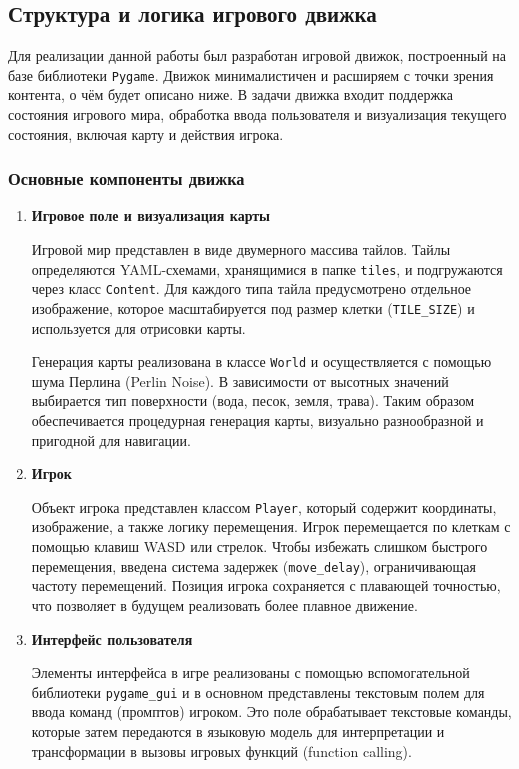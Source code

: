 \documentclass[14pt]{extarticle}
\begin{document}
\subsection{Структура и логика игрового движка}
Для реализации данной работы был разработан игровой движок, построенный на базе библиотеки \texttt{Pygame}. Движок минималистичен и расширяем с точки зрения контента, о чём будет описано ниже. В задачи движка входит поддержка состояния игрового мира, обработка ввода пользователя и визуализация текущего состояния, включая карту и действия игрока.

\subsubsection*{Основные компоненты движка}

\begin{enumerate}
    \item \textbf{Игровое поле и визуализация карты}

    Игровой мир представлен в виде двумерного массива тайлов. Тайлы определяются YAML-схемами, хранящимися в папке \texttt{tiles}, и подгружаются через класс \texttt{Content}. Для каждого типа тайла предусмотрено отдельное изображение, которое масштабируется под размер клетки (\texttt{TILE\_SIZE}) и используется для отрисовки карты.

    Генерация карты реализована в классе \texttt{World} и осуществляется с помощью шума Перлина (Perlin Noise). В зависимости от высотных значений выбирается тип поверхности (вода, песок, земля, трава). Таким образом обеспечивается процедурная генерация карты, визуально разнообразной и пригодной для навигации.

    \item \textbf{Игрок}

    Объект игрока представлен классом \texttt{Player}, который содержит координаты, изображение, а также логику перемещения. Игрок перемещается по клеткам с помощью клавиш WASD или стрелок. Чтобы избежать слишком быстрого перемещения, введена система задержек (\texttt{move\_delay}), ограничивающая частоту перемещений. Позиция игрока сохраняется с плавающей точностью, что позволяет в будущем реализовать более плавное движение.

    \item \textbf{Интерфейс пользователя}

    Элементы интерфейса в игре реализованы с помощью вспомогательной библиотеки \texttt{pygame\_gui} и в основном представлены текстовым полем для ввода команд (промптов) игроком. Это поле обрабатывает текстовые команды, которые затем передаются в языковую модель для интерпретации и трансформации в вызовы игровых функций (function calling).


\end{enumerate}
\end{document}
